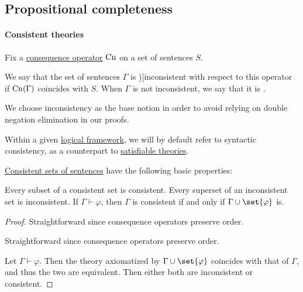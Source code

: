 \subsection{Propositional completeness}\label{subsec:propositional_completeness}

\paragraph{Consistent theories}

\begin{definition}\label{def:consistent_set_of_sentences}
  Fix a \hyperref[def:consequence_operator]{consequence operator} \( \op{Cn} \) on a set of sentences \( S \).

  We say that the set of sentences \( \Gamma \) is \term[ru=противоречивое (множество формул) (\cite[def. 1.3.15]{Герасимов2011})]{inconsistent} with respect to this operator if \( \op{Cn}(\Gamma) \) coincides with \( S \). When \( \Gamma \) is not inconsistent, we say that it is .
\end{definition}
\begin{comments}
  \item We choose inconsistency as the base notion in order to avoid relying on double negation elimination in our proofs.
  \item Within a given \hyperref[def:logical_framework]{logical framework}, we will by default refer to syntactic consistency, as a counterpart to \hyperref[def:satisfiable_set_of_sentences]{satisfiable theories}.
\end{comments}

\begin{proposition}\label{thm:def:consistent_set_of_sentences}
  \hyperref[def:consistent_set_of_sentences]{Consistent sets of sentences} have the following basic properties:
  \begin{thmenum}
     Every subset of a consistent set is consistent.
     Every superset of an inconsistent set is inconsistent.
     If \( \Gamma \vdash \varphi \), then \( \Gamma \) is consistent if and only if \( \Gamma \cup \set{ \varphi } \) is.
  \end{thmenum}
\end{proposition}
\begin{proof}
   Straightforward since consequence operators preserve order.

   Straightforward since consequence operators preserve order.

   Let \( \Gamma \vdash \varphi \). Then the theory axiomatized by \( \Gamma \cup \set{ \varphi } \) coincides with that of \( \Gamma \), and thus the two are equivalent. Then either both are inconsistent or consistent.
\end{proof}

